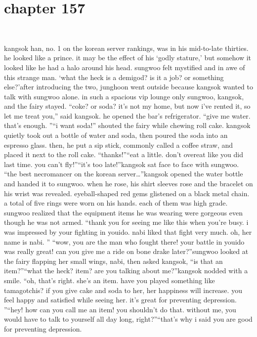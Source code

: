 \section{chapter 157}

                             




kangsok han, no.
 1 on the korean server rankings, was in his mid-to-late thirties.
 he looked like a prince.
it may be the effect of his ‘godly stature,’ but somehow it looked like he had a halo around his head.
 sungwoo felt mystified and in awe of this strange man.
‘what the heck is a demigod? is it a job? or something else?’after introducing the two, junghoon went outside because kangsok wanted to talk with sungwoo alone.
in such a spacious vip lounge only sungwoo, kangsok, and the fairy stayed.
“coke? or soda? it’s not my home, but now i’ve rented it, so let me treat you,” said kangsok.
he opened the bar’s refrigerator.
“give me water.
 that’s enough.
”“i want soda!” shouted the fairy while chewing roll cake.
kangsok quietly took out a bottle of water and soda, then poured the soda into an espresso glass.
 then, he put a sip stick, commonly called a coffee straw, and placed it next to the roll cake.
“thanks!”“eat a little.
 don’t overeat like you did last time.
 you can’t fly!”“it’s too late!”kangsok sat face to face with sungwoo.
“the best necromancer on the korean server…”kangsok opened the water bottle and handed it to sungwoo.
 when he rose, his shirt sleeves rose and the bracelet on his wrist was revealed.
eyeball-shaped red gems glistened on a black metal chain.
 a total of five rings were worn on his hands.
 each of them was high grade.
 sungwoo realized that the equipment items he was wearing were gorgeous even though he was not armed.
“thank you for seeing me like this when you’re busy.
 i was impressed by your fighting in youido.
 nabi liked that fight very much.
 oh, her name is nabi.
”
“wow, you are the man who fought there! your battle in youido was really great! can you give me a ride on bone drake later?”sungwoo looked at the fairy flapping her small wings, nabi, then asked kangsok, “is that an item?”“what the heck? item? are you talking about me?”kangsok nodded with a smile.
“oh, that’s right.
 she’s an item.
 have you played something like tamagotchis? if you give cake and soda to her, her happiness will increase.
 you feel happy and satisfied while seeing her.
 it’s great for preventing depression.
”“hey! how can you call me an item! you shouldn’t do that.
 without me, you would have to talk to yourself all day long, right?”“that’s why i said you are good for preventing depression.

